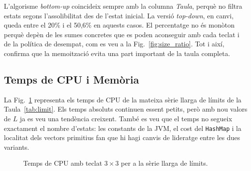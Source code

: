 \documentclass[conference,compsoc]{IEEEtran}
\begin{document}
L'algorisme \textit{bottom-up} coincideix sempre amb la columna \textit{Taula},
perquè no filtra estats segons l'assolibilitat des de l'estat inicial. La versió
\textit{top-down}, en canvi, queda entre el 20\% i el 50,6\% en aquests casos. El
percentatge no és monòton perquè depèn de les sumes concretes que es poden
aconseguir amb cada teclat i de la política de desempat, com es veu a la
Fig.~\ref{fig:size_ratio}. Tot i així, confirma que
la memoització evita una part important de la taula completa.

\subsection{Temps de CPU i Memòria}

La Fig.~\ref{fig:cpu_3x3} representa els temps de CPU de la mateixa sèrie llarga
de límits de la Taula~\ref{tab:limit}. Els temps absoluts continuen essent petits,
però amb nou valors de $L$ ja es veu una tendència creixent. També es veu que el
temps no segueix exactament el nombre d'estats: les constants de la JVM, el cost
del \texttt{HashMap} i la localitat dels vectors primitius fan que hi hagi canvis
de lideratge entre les dues variants.

\begin{figure}[H]
\centering
{}
\caption{Temps de CPU amb teclat $3\times3$ per a la sèrie llarga de límits.}
\label{fig:cpu_3x3}
\end{figure}
\end{document}
